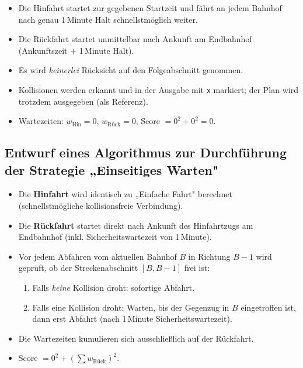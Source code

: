 \documentclass[12pt,a4paper]{article}
\begin{document}
\begin{itemize}
  \item Die Hinfahrt startet zur gegebenen Startzeit und fährt an jedem Bahnhof
        nach genau 1\,Minute Halt schnellstmöglich weiter.
  \item Die Rückfahrt startet unmittelbar nach Ankunft am Endbahnhof
        (Ankunftszeit + 1\,Minute Halt).
  \item Es wird \emph{keinerlei} Rücksicht auf den Folgeabschnitt genommen.
  \item Kollisionen werden erkannt und in der Ausgabe mit \texttt{x} markiert;
        der Plan wird trotzdem ausgegeben (als Referenz).
  \item Wartezeiten: $w_{\text{Hin}} = 0$, $w_{\text{Rück}} = 0$,
        Score $= 0^2 + 0^2 = 0$.
\end{itemize}

\subsection{Entwurf eines Algorithmus zur Durchführung der Strategie „Einseitiges Warten"}

\begin{itemize}
  \item Die \textbf{Hinfahrt} wird identisch zu „Einfache Fahrt" berechnet
        (schnellstmögliche kollisionsfreie Verbindung).
  \item Die \textbf{Rückfahrt} startet direkt nach Ankunft des Hinfahrtzugs am
        Endbahnhof (inkl. Sicherheitswartezeit von 1\,Minute).
  \item Vor jedem Abfahren vom aktuellen Bahnhof $B$ in Richtung $B-1$ wird
        geprüft, ob der Streckenabschnitt $[B, B-1]$ frei ist:
        \begin{enumerate}
          \item Falls \emph{keine} Kollision droht: sofortige Abfahrt.
          \item Falls eine Kollision droht: Warten, bis der Gegenzug in $B$
                eingetroffen ist, dann erst Abfahrt (nach 1\,Minute Sicherheitswartezeit).
        \end{enumerate}
  \item Die Wartezeiten kumulieren sich ausschließlich auf der Rückfahrt.
  \item Score $= 0^2 + \left(\sum w_{\text{Rück}}\right)^2$.
\end{itemize}
\end{document}
